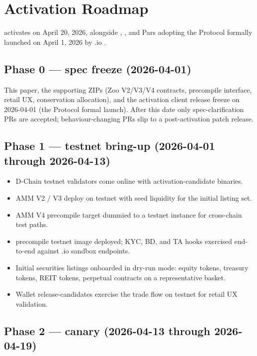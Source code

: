 \section{Activation Roadmap}
\label{sec:roadmap}

\Zoo{} \DEX{} activates on April 20, 2026, alongside \Lux{},
\Hanzo{}, and Pars adopting the \Liquidity{} Protocol formally
launched on April 1, 2026 by \Liquidity{}.io
\cite{liquidity-protocol-formal,zoo-adopts-liquidity-protocol}.

\subsection{Phase 0 --- spec freeze (2026-04-01)}

This paper, the supporting ZIPs (Zoo \DEX{} V2/V3/V4 contracts,
\Liquidity{} precompile interface, retail UX, conservation
allocation), and the activation client release freeze on
2026-04-01 (the \Liquidity{} Protocol formal launch). After this
date only spec-clarification PRs are accepted; behaviour-changing
PRs slip to a post-activation patch release.

\subsection{Phase 1 --- testnet bring-up (2026-04-01 through 2026-04-13)}

\begin{itemize}[leftmargin=1.2em]
  \item \Zoo{} D-Chain testnet validators come online with
        activation-candidate binaries.
  \item AMM V2 / V3 deploy on testnet with seed liquidity for the
        initial listing set.
  \item AMM V4 precompile target dummied to a testnet \Lux{} \DEX{}
        instance for cross-chain test paths.
  \item \Liquidity{} precompile testnet image deployed; KYC, BD,
        and TA hooks exercised end-to-end against \Liquidity{}.io
        sandbox endpoints.
  \item Initial securities listings onboarded in dry-run mode:
        equity tokens, treasury tokens, REIT tokens, perpetual
        contracts on a representative basket.
  \item Wallet release-candidates exercise the trade flow on
        testnet for retail UX validation.
\end{itemize}

\subsection{Phase 2 --- canary (2026-04-13 through 2026-04-19)}

